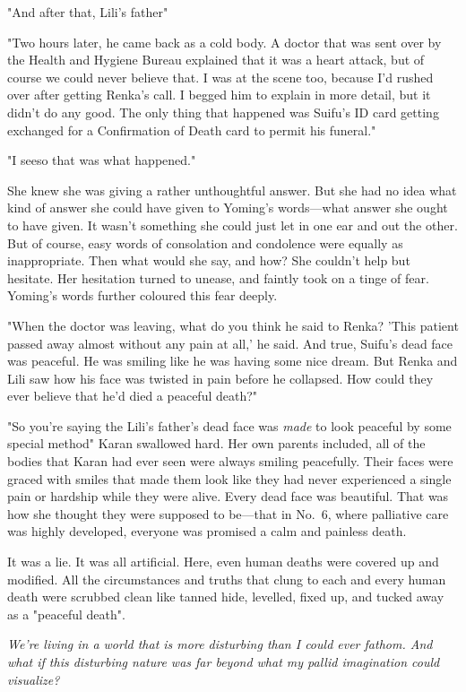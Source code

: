 "And after that, Lili's father\el "

"Two hours later, he came back as a cold body. A doctor that was sent
over by the Health and Hygiene Bureau explained that it was a heart
attack, but of course we could never believe that. I was at the scene
too, because I'd rushed over after getting Renka's call. I begged him to
explain in more detail, but it didn't do any good. The only thing that
happened was Suifu's ID card getting exchanged for a Confirmation of
Death card to permit his funeral."

"I see\el so that was what happened."

She knew she was giving a rather unthoughtful answer. But she had no
idea what kind of answer she could have given to Yoming's words---what
answer she ought to have given. It wasn't something she could just let
in one ear and out the other. But of course, easy words of consolation
and condolence were equally as inappropriate. Then what would she say,
and how? She couldn't help but hesitate. Her hesitation turned to
unease, and faintly took on a tinge of fear. Yoming's words further
coloured this fear deeply.

"When the doctor was leaving, what do you think he said to Renka? 'This
patient passed away almost without any pain at all,' he said. And true,
Suifu's dead face was peaceful. He was smiling like he was having some
nice dream. But Renka and Lili saw how his face was twisted in pain
before he collapsed. How could they ever believe that he'd died a
peaceful death?"

"So you're saying the Lili's father's dead face was \emph{made} to look
peaceful by some special method\el " Karan swallowed hard. Her own
parents included, all of the bodies that Karan had ever seen were always
smiling peacefully. Their faces were graced with smiles that made them
look like they had never experienced a single pain or hardship while
they were alive. Every dead face was beautiful. That was how she thought
they were supposed to be---that in No.~6, where palliative care was highly
developed, everyone was promised a calm and painless death.

It was a lie. It was all artificial. Here, even human deaths were
covered up and modified. All the circumstances and truths that clung to
each and every human death were scrubbed clean like tanned hide,
levelled, fixed up, and tucked away as a "peaceful death".

\emph{We're living in a world that is more disturbing than I could ever
fathom. And what if this disturbing nature was far beyond what my pallid
imagination could visualize\el ?}

